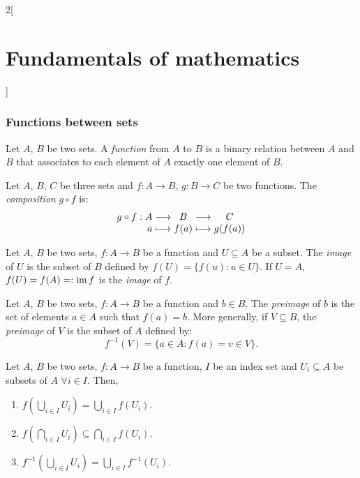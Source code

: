 \documentclass[../../../main.tex]{subfiles}
\begin{document}
\begin{multicols}{2}[\section{Fundamentals of mathematics}]
  \subsubsection{Functions between sets}
  \begin{definition}
    Let $A$, $B$ be two sets. A \emph{function} from $A$ to $B$ is a binary relation between $A$ and $B$ that associates to each element of $A$ exactly one element of $B$.
  \end{definition}
  \begin{definition}
    Let $A$, $B$, $C$ be three sets and $f:A\rightarrow B$, $g:B\rightarrow C$ be two functions. The \emph{composition} $g\circ f$ is:
    $$\begin{array}{r@{\hspace{0.5\tabcolsep}}c@{\hspace{0.5\tabcolsep}}c@{\hspace{0.5\tabcolsep}}c@{\hspace{0.5\tabcolsep}}c}
        g\circ f:A & \longrightarrow & B    & \longrightarrow & C       \\
        a          & \longmapsto     & f(a) & \longmapsto     & g(f(a))
      \end{array}$$
  \end{definition}
  \begin{definition}
    Let $A$, $B$ be two sets, $f:A\rightarrow B$ be a function and $U\subseteq A$ be a subset. The \emph{image} of $U$ is the subset of $B$ defined by $f(U)=\{f(u): u\in U\}$. If $U=A$, $f(U)=f(A)=:\operatorname{im} f$ is the \emph{image} of $f$.
  \end{definition}
  \begin{definition}
    Let $A$, $B$ be two sets, $f:A\rightarrow B$ be a function and $b\in B$. The \emph{preimage} of $b$ is the set of elements $a\in A$ such that $f(a)=b$. More generally, if $V\subseteq B$, the \emph{preimage} of $V$ is the subset of $A$ defined by: $$f^{-1}(V)=\{a\in A: f(a)=v\in V\}.$$
  \end{definition}
  \begin{prop}
    Let $A$, $B$ be two sets, $f:A\rightarrow B$ be a function, $I$ be an index set and $U_i\subseteq A$ be subsets of $A$ $\forall i\in I$. Then,
    \begin{enumerate}
      \item $f\left(\bigcup_{i\in I}U_i\right)=\bigcup_{i\in I}f(U_i)$.
      \item $f\left(\bigcap_{i\in I}U_i\right)\subseteq\bigcap_{i\in I}f(U_i)$.
      \item $f^{-1}\left(\bigcup_{i\in I}U_i\right)=\bigcup_{i\in I}f^{-1}(U_i)$.

\end{enumerate}
\end{prop}
\end{multicols}
\end{document}
